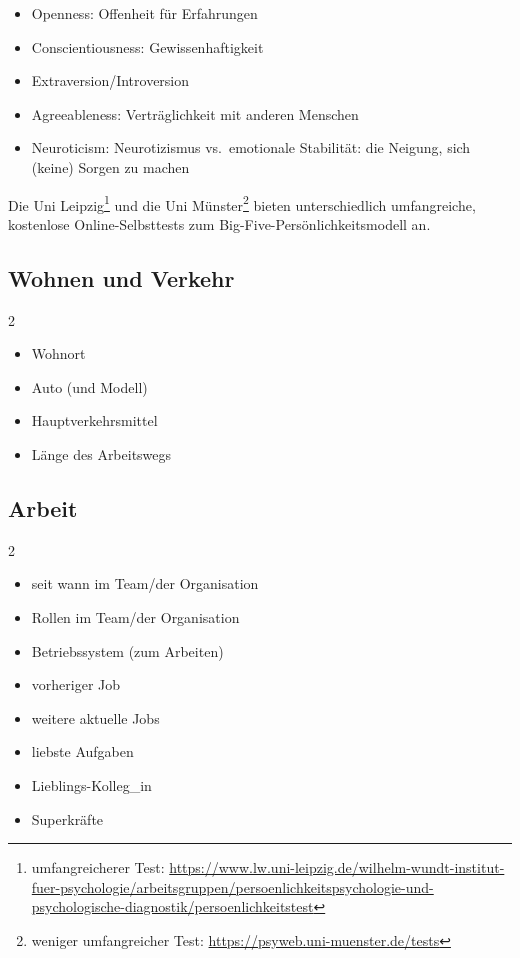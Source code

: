 \begin{itemize}
    \item {} Openness: Offenheit für Erfahrungen
    \item {} Conscientiousness: Gewissenhaftigkeit
    \item {} Extraversion/Introversion
    \item {} Agreeableness: Verträglichkeit mit anderen Menschen
    \item {} Neuroticism: Neurotizismus vs.~emotionale Stabilität: die Neigung, sich (keine) Sorgen zu machen
\end{itemize}

Die Uni Leipzig\footnote{umfangreicherer Test: \url{https://www.lw.uni-leipzig.de/wilhelm-wundt-institut-fuer-psychologie/arbeitsgruppen/persoenlichkeitspsychologie-und-psychologische-diagnostik/persoenlichkeitstest}} und die Uni Münster\footnote{weniger umfangreicher Test: \url{https://psyweb.uni-muenster.de/tests}} bieten unterschiedlich umfangreiche, kostenlose Online-Selbsttests zum Big-Five-Persönlichkeitsmodell an.

\subsection{Wohnen und Verkehr}

\begin{multicols}{2}
    \begin{itemize}
        \item Wohnort
        \item Auto (und Modell)
        \item Hauptverkehrsmittel
        \item Länge des Arbeitswegs
    \end{itemize}
\end{multicols}

\subsection{Arbeit}

\begin{multicols}{2}
    \begin{itemize}
        \item seit wann im Team/der Organisation
        \item Rollen im Team/der Organisation
        \item Betriebssystem (zum Arbeiten)
        \item vorheriger Job
        \item weitere aktuelle Jobs
        \item liebste Aufgaben
        \item Lieblings-Kolleg\_in
        \item Superkräfte
    \end{itemize}
\end{multicols}

